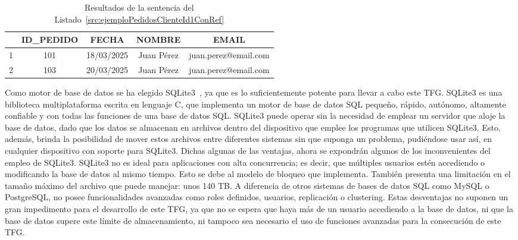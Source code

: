 \begin{table}[H]
\centering
\begin{tabular}{r|c|c|c|c|}
\cline{2-5}
\multicolumn{1}{l|}{} &
  \cellcolor[HTML]{C0C0C0}\textbf{ID\_PEDIDO} &
  \cellcolor[HTML]{C0C0C0}\textbf{FECHA} &
  \cellcolor[HTML]{C0C0C0}\textbf{NOMBRE} &
  \cellcolor[HTML]{C0C0C0}\textbf{EMAIL} \\ \hline
\multicolumn{1}{|r|}{1} &
  101 &
  18/03/2025 &
  Juan Pérez &
  juan.perez@email.com \\ \hline
\multicolumn{1}{|r|}{2} &
  103 &
  20/03/2025 &
  Juan Pérez &
  juan.perez@email.com \\ \hline
\end{tabular}
\caption{Resultados de la sentencia del Listado~\ref{src:ejemploPedidosClienteId1ConRef}}
\label{tab:ejemploSelectTablaId1ConRef}
\end{table}

Como motor de base de datos se ha elegido SQLite3~\cite{SQLite3}, ya que es lo suficientemente potente para llevar a cabo este \acrshort{TFG}. SQLite3 es una biblioteca multiplataforma escrita en lenguaje C, que implementa un motor de base de datos \acrshort{SQL} pequeño, rápido, autónomo, altamente confiable y con todas las funciones de una base de datos \acrshort{SQL}. SQLite3 puede operar sin la necesidad de emplear un servidor que aloje la base de datos, dado que los datos se almacenan en archivos dentro del dispositivo que emplee los programas que utilicen SQLite3. Esto, además, brinda la posibilidad de mover estos archivos entre diferentes sistemas sin que suponga un problema, pudiéndose usar así, en cualquier dispositivo con soporte para SQLite3. Dichas algunas de las ventajas, ahora se expondrán algunos de los inconvenientes del empleo de SQLite3. SQLite3 no es ideal para aplicaciones con alta concurrencia; es decir, que múltiples usuarios estén accediendo o modificando la base de datos al mismo tiempo. Esto se debe al modelo de bloqueo que implementa. También presenta una limitación en el tamaño máximo del archivo que puede manejar: unos 140 \acrfull{TB}. A diferencia de otros sistemas de bases de datos SQL como MySQL o PostgreSQL, no posee funcionalidades avanzadas como roles definidos, usuarios, replicación o clustering. Estas desventajas no suponen un gran impedimento para el desarrollo de este \acrshort{TFG}, ya que no se espera que haya más de un usuario accediendo a la base de datos, ni que la base de datos supere este límite de almacenamiento, ni tampoco sea necesario el uso de funciones avanzadas para la consecución de este TFG.